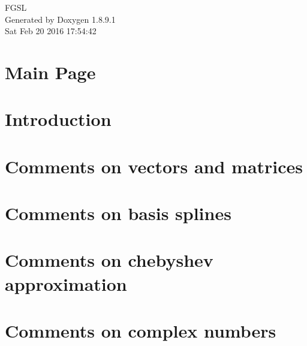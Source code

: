 \documentclass[twoside]{book}
\newcommand{\+}{\discretionary{\mbox{\scriptsize$\hookleftarrow$}}{}{}}
\newcommand{\clearemptydoublepage}{%
  \newpage{\pagestyle{empty}\cleardoublepage}%
}
\begin{document}
\hypersetup{pageanchor=false,
             bookmarks=true,
             bookmarksnumbered=true,
             pdfencoding=unicode
            }
\begin{titlepage}
\vspace*{7cm}
\begin{center}%
{\Large F\+G\+S\+L }\\
\vspace*{1cm}
{\large Generated by Doxygen 1.8.9.1}\\
\vspace*{0.5cm}
{\small Sat Feb 20 2016 17:54:42}\\
\end{center}
\end{titlepage}
\clearemptydoublepage
\tableofcontents
\clearemptydoublepage
{}
\hypersetup{pageanchor=true}

\chapter{Main Page}
\label{index}\hypertarget{index}{}
\chapter{Introduction}
\label{Introduction}
\hypertarget{Introduction}{}

\chapter{Comments on vectors and matrices}
\label{Comments_01on_01vectors_01and_01matrices}
\hypertarget{Comments_01on_01vectors_01and_01matrices}{}

\chapter{Comments on basis splines}
\label{Comments_01on_01basis_01splines}
\hypertarget{Comments_01on_01basis_01splines}{}

\chapter{Comments on chebyshev approximation}
\label{Comments_01on_01chebyshev_01approximation}
\hypertarget{Comments_01on_01chebyshev_01approximation}{}

\chapter{Comments on complex numbers}
\label{Comments_01on_01complex_01numbers}
\hypertarget{Comments_01on_01complex_01numbers}{}

\end{document}
